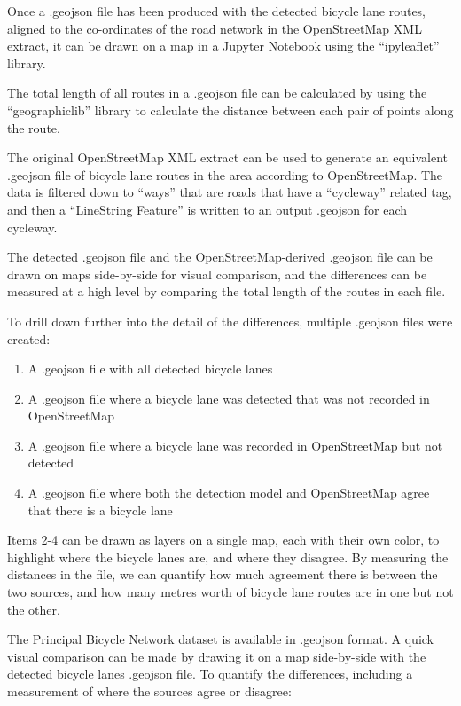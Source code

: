 \documentclass[11pt,twoside]{report}
\begin{document}
Once a .geojson file has been produced with the detected bicycle lane routes, aligned to the co-ordinates of the road network in the OpenStreetMap XML extract, it can be drawn on a map in a Jupyter Notebook using the ``ipyleaflet'' library.

The total length of all routes in a .geojson file can be calculated by using the ``geographiclib'' library to calculate the distance between each pair of points along the route.

The original OpenStreetMap XML extract can be used to generate an equivalent .geojson file of bicycle lane routes in the area according to OpenStreetMap.  The data is filtered down to ``ways'' that are roads that have a ``cycleway'' related tag, and then a ``LineString Feature'' is written to an output .geojson for each cycleway.

The detected .geojson file and the OpenStreetMap-derived .geojson file can be drawn on maps side-by-side for visual comparison, and the differences can be measured at a high level by comparing the total length of the routes in each file.

To drill down further into the detail of the differences, multiple .geojson files were created:

\begin{enumerate}
\item{A .geojson file with all detected bicycle lanes}
\item{A .geojson file where a bicycle lane was detected that was not recorded in OpenStreetMap}
\item{A .geojson file where a bicycle lane was recorded in OpenStreetMap but not detected}
\item{A .geojson file where both the detection model and OpenStreetMap agree that there is a bicycle lane}	
\end{enumerate}

Items 2-4 can be drawn as layers on a single map, each with their own color, to highlight where the bicycle lanes are, and where they disagree.  By measuring the distances in the file, we can quantify how much agreement there is between the two sources, and how many metres worth of bicycle lane routes are in one but not the other.

The Principal Bicycle Network dataset is available in .geojson format.  A quick visual comparison can be made by drawing it on a map side-by-side with the detected bicycle lanes .geojson file.  To quantify the differences, including a measurement of where the sources agree or disagree:
\end{document}
